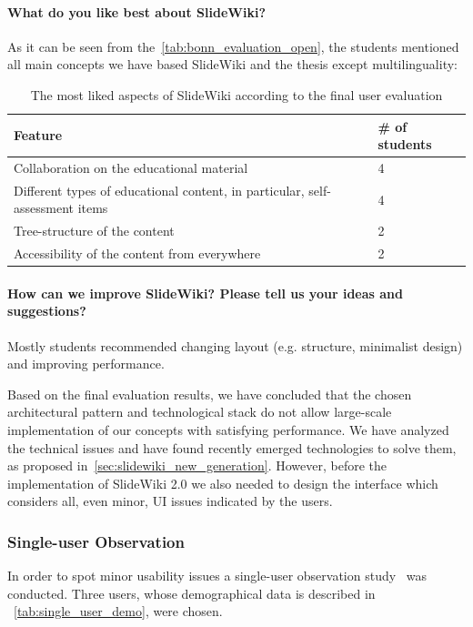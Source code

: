 \documentclass[ngerman,UKenglish,table]{scrbook}
\begin{document}
\paragraph{What do you like best about SlideWiki?} As it can be seen from the~\autoref{tab:bonn_evaluation_open}, the students mentioned all main concepts we have based SlideWiki and the thesis except multilinguality:

\begin{table}[!h]
\centering

\begin{tabularx}{\columnwidth}{ll}    
    \toprule
    
    \textbf{Feature} & \textbf{\# of students} \\
    \midrule
    Collaboration on the educational material & 4 \\
    Different types of educational content, in particular, self-assessment items & 4\\
    Tree-structure of the content & 2 \\
    Accessibility of the content from everywhere & 2 \\
	\bottomrule
    \end{tabularx}
\caption{The most liked aspects of SlideWiki according to the final user evaluation}
\label{tab:bonn_evaluation_open}
\end{table}

\paragraph{How can we improve SlideWiki? Please tell us your ideas and suggestions?} Mostly students recommended changing layout (e.g. structure, minimalist design) and improving performance.

Based on the final evaluation results, we have concluded that the chosen architectural pattern and technological stack do not allow large-scale implementation of our concepts with satisfying performance.
We have analyzed the technical issues and have found  recently emerged technologies to solve them, as proposed in~\autoref{sec:slidewiki_new_generation}.
However, before the implementation of SlideWiki 2.0 we also needed to design the interface which considers all, even minor, UI issues indicated by the users.

\subsubsection{Single-user Observation}
In order to spot minor usability issues a single-user observation study~\cite{hasanov2015measuring} was conducted.
Three users, whose demographical data is described in ~\autoref{tab:single_user_demo}, were chosen.
\end{document}

